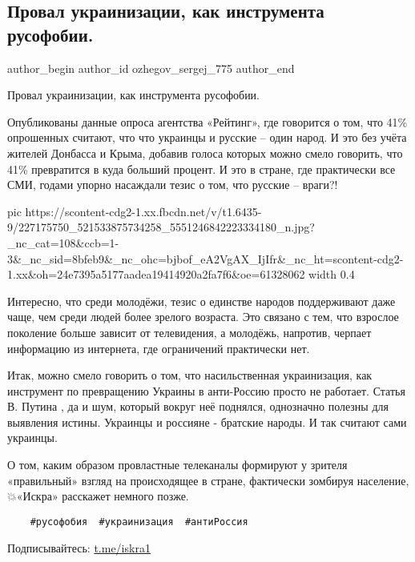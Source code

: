  
 
 
 
 
 
\subsection{Провал украинизации, как инструмента русофобии.}
\label{sec:29_07_2021.fb.ozhegov_sergej_775.1.proval_ukrainizacia}
 
\ifcmt
 author_begin
   author_id ozhegov_sergej_775
 author_end
\fi

Провал украинизации, как инструмента русофобии.

Опубликованы данные опроса агентства «Рейтинг», где говорится о том, что 41\%
опрошенных считают, что что украинцы и русские – один народ.  И это без учёта
жителей Донбасса и Крыма, добавив голоса которых можно смело говорить, что 41\%
превратится в куда больший процент. И это в стране, где практически все СМИ,
годами упорно насаждали тезис о том, что русские – враги?! 

\ifcmt
  pic https://scontent-cdg2-1.xx.fbcdn.net/v/t1.6435-9/227175750_521533875734258_5551246842223334180_n.jpg?_nc_cat=108&ccb=1-3&_nc_sid=8bfeb9&_nc_ohc=bjbof_eA2VgAX_IjIfr&_nc_ht=scontent-cdg2-1.xx&oh=24e7395a5177aadea19414920a2fa7f6&oe=61328062
  width 0.4
\fi

Интересно, что среди молодёжи, тезис о единстве народов поддерживают даже чаще,
чем среди людей более зрелого возраста. Это связано с тем, что взрослое
поколение больше зависит от телевидения, а молодёжь, напротив, черпает
информацию из интернета, где ограничений практически нет.

Итак, можно смело говорить о том, что насильственная украинизация, как
инструмент по превращению Украины в анти-Россию просто не работает. Статья В.
Путина , да и шум, который вокруг неё поднялся, однозначно полезны для
выявления истины. Украинцы и россияне - братские народы. И так считают сами
украинцы.

О том, каким образом провластные телеканалы формируют у зрителя «правильный»
взгляд на происходящее в стране, фактически зомбируя население, 💥«Искра»
расскажет немного позже.

\begin{verbatim}
	#русофобия  #украинизация  #антиРоссия
\end{verbatim}
Подписывайтесь:
\url{t.me/iskra1}

